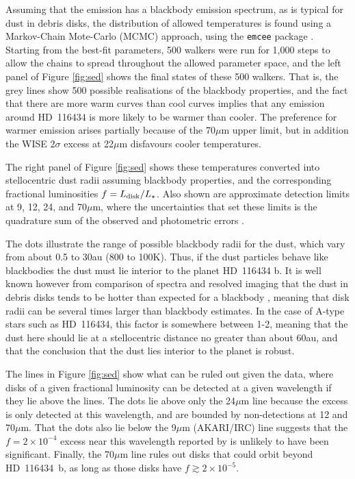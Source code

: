 \documentclass[a4paper,fleqn,usenatbib]{mnras}
\begin{document}
Assuming that the emission has a blackbody emission spectrum, as is
typical for dust in debris disks, the distribution of allowed
temperatures is found using a Markov-Chain Mote-Carlo (MCMC) approach,
using the \texttt{emcee} package
\citep{gw2010,2013PASP..125..306F}. Starting from the best-fit
parameters, 500 walkers were run for 1,000 steps to allow the chains to
spread throughout the allowed parameter space, and the left panel of
Figure \ref{fig:sed} shows the final states of these 500 walkers. That
is, the grey lines show 500 possible realisations of the blackbody
properties, and the fact that there are more warm curves than cool
curves implies that any emission around HD~116434 is more likely to be
warmer than cooler. The preference for warmer emission arises partially
because of the 70$\mu$m upper limit, but in addition the WISE 2$\sigma$
excess at 22$\mu$m disfavours cooler temperatures.

The right panel of Figure \ref{fig:sed} shows these temperatures
converted into stellocentric dust radii assuming blackbody properties,
and the corresponding fractional luminosities $f=L_{\rm
  disk}/L_\star$. Also shown are approximate detection limits at 9, 12,
24, and 70$\mu$m, where the uncertainties that set these limits is the
quadrature sum of the observed and photometric errors
\citep[see][]{2008ARA&A..46..339W}.

The dots illustrate the range of possible blackbody radii for the dust,
which vary from about 0.5 to 30au (800 to 100K). Thus, if the dust
particles behave like blackbodies the dust must lie interior to the
planet HD~116434 b. It is well known however from comparison of spectra
and resolved imaging that the dust in debris disks tends to be hotter
than expected for a blackbody
\citep[e.g.][]{2012ApJ...745..147R,2013MNRAS.428.1263B,2016ApJ...831...97M},
meaning that disk radii can be several times larger than blackbody
estimates. In the case of A-type stars such as HD~116434, this factor is
somewhere between 1-2, meaning that the dust here should lie at a
stellocentric distance no greater than about 60au, and that the
conclusion that the dust lies interior to the planet is robust.

The lines in Figure \ref{fig:sed} show what can be ruled out given the
data, where disks of a given fractional luminosity can be detected at a
given wavelength if they lie above the lines. The dots lie above only
the 24$\mu$m line because the excess is only detected at this
wavelength, and are bounded by non-detections at 12 and 70$\mu$m. That
the dots also lie below the 9$\mu$m (AKARI/IRC) line suggests that the
$f=2 \times 10^{-4}$ excess near this wavelength reported by
\citet{2012MNRAS.427..343M} is unlikely to have been
significant. Finally, the 70$\mu$m line rules out disks that could orbit
beyond HD~116434~b, as long as those disks have
$f \gtrsim 2 \times 10^{-5}$.
\end{document}
